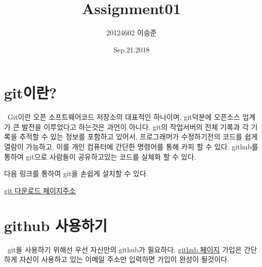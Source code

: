 \documentclass[12pt]{article}
\title{Assignment01}
\author{20124602 이승준}
\date{Sep.21.2018}
\begin{document}
  \maketitle
  \section[시작]{git이란?}
  	\ Git이란 오픈 소프트웨어코드 저장소의 대표적인 하나이며, git덕분에 오픈소스 업계가 큰 발전을 이루었다고 하는것은 과언이 아니다. git의 작업서버의 전체 기록과 각 기록을 추적할 수 있는 정보를 포함하고 있어서, 프로그래머가 수정하기전의 코드를 쉽게 열람이 가능하고, 이를 개인 컴퓨터에 간단한 명령어를 통해 카피 할 수 있다. github를 통하여 git으로 사람들이 공유하고있는 코드를 실체화 할 수 있다.
  	
  	다음 링크를 통하여 git을 손쉽게 설치할 수 있다.
  	
    \href{https://git-scm.com/download/win}{git 다운로드 페이지주소}
  \section{github 사용하기}
  \ git을 사용하기 위해선 우선 자신만의 github가 필요하다.
  	 \href{https://git-scm.com/download/win}{github 페이지}
  	가입은 간단하게 자신이 사용하고 있는 이메일 주소만 입력하면 가입이 완성이 될것이다.
\end{document}
